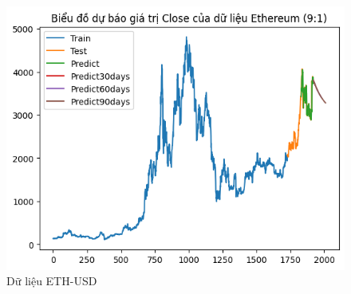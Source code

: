 \documentclass[conference]{IEEEtran}
\begin{document}
\begin{figure}[H]
\begin{minipage}{0.15\textwidth}
			\includegraphics[width=1\textwidth]{Figure/GRU_ETH_91.png}
		\end{minipage}
		\caption{Dữ liệu ETH-USD}
		\label{fig:1}
	\end{figure}
	
\end{document}

